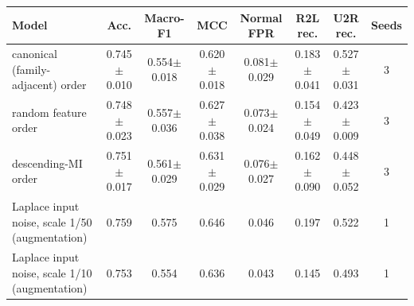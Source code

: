 \begin{tabular}{lccccccc}
\toprule
Model & Acc. & Macro-F1 & MCC & Normal FPR & R2L rec. & U2R rec. & Seeds \\
\midrule
canonical (family-adjacent) order & 0.745$\pm$0.010 & 0.554$\pm$0.018 & 0.620$\pm$0.018 & 0.081$\pm$0.029 & 0.183$\pm$0.041 & 0.527$\pm$0.031 & 3 \\
random feature order & 0.748$\pm$0.023 & 0.557$\pm$0.036 & 0.627$\pm$0.038 & 0.073$\pm$0.024 & 0.154$\pm$0.049 & 0.423$\pm$0.009 & 3 \\
descending-MI order & 0.751$\pm$0.017 & 0.561$\pm$0.029 & 0.631$\pm$0.029 & 0.076$\pm$0.027 & 0.162$\pm$0.090 & 0.448$\pm$0.052 & 3 \\
Laplace input noise, scale 1/50 (augmentation) & 0.759 & 0.575 & 0.646 & 0.046 & 0.197 & 0.522 & 1 \\
Laplace input noise, scale 1/10 (augmentation) & 0.753 & 0.554 & 0.636 & 0.043 & 0.145 & 0.493 & 1 \\
\bottomrule
\end{tabular}
